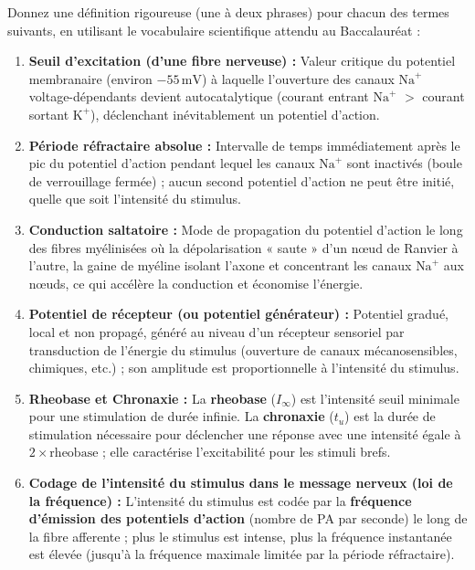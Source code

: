 \documentclass[11pt]{article}
\begin{document}
\begin{exercice}
Donnez une définition rigoureuse (une à deux phrases) pour chacun des termes suivants, en utilisant le vocabulaire scientifique attendu au Baccalauréat :
\begin{enumerate}
\item \textbf{Seuil d'excitation (d'une fibre nerveuse) :} Valeur critique du potentiel membranaire (environ $-55\,\text{mV}$) à laquelle l'ouverture des canaux $\text{Na}^+$ voltage-dépendants devient autocatalytique (courant entrant $\text{Na}^+$ $>$ courant sortant $\text{K}^+$), déclenchant inévitablement un potentiel d'action.
\item \textbf{Période réfractaire absolue :} Intervalle de temps immédiatement après le pic du potentiel d'action pendant lequel les canaux $\text{Na}^+$ sont inactivés (boule de verrouillage fermée) ; aucun second potentiel d'action ne peut être initié, quelle que soit l'intensité du stimulus.
\item \textbf{Conduction saltatoire :} Mode de propagation du potentiel d'action le long des fibres myélinisées où la dépolarisation « saute » d'un nœud de Ranvier à l'autre, la gaine de myéline isolant l'axone et concentrant les canaux $\text{Na}^+$ aux nœuds, ce qui accélère la conduction et économise l'énergie.
\item \textbf{Potentiel de récepteur (ou potentiel générateur) :} Potentiel gradué, local et non propagé, généré au niveau d'un récepteur sensoriel par transduction de l'énergie du stimulus (ouverture de canaux mécanosensibles, chimiques, etc.) ; son amplitude est proportionnelle à l'intensité du stimulus.
\item \textbf{Rheobase et Chronaxie :} La \textbf{rheobase} ($I_{\infty}$) est l'intensité seuil minimale pour une stimulation de durée infinie. La \textbf{chronaxie} ($t_u$) est la durée de stimulation nécessaire pour déclencher une réponse avec une intensité égale à $2 \times \text{rheobase}$ ; elle caractérise l'excitabilité pour les stimuli brefs.
\item \textbf{Codage de l'intensité du stimulus dans le message nerveux (loi de la fréquence) :} L'intensité du stimulus est codée par la \textbf{fréquence d'émission des potentiels d'action} (nombre de PA par seconde) le long de la fibre afferente ; plus le stimulus est intense, plus la fréquence instantanée est élevée (jusqu'à la fréquence maximale limitée par la période réfractaire).
\end{enumerate}
\end{exercice}
\end{document}

